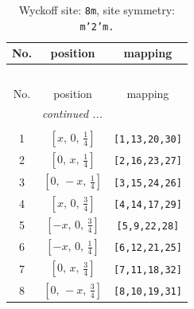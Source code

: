 \documentclass[fleqn,8pt]{jsarticle}
\begin{document}
\begin{longtable}{ccc}
\caption{Wyckoff site: {\tt 8m}, site symmetry: {\tt m'2'm.}}
 \\
 \hline \hline
No. & position & mapping \\ \hline \endfirsthead

\multicolumn{2}{l}{\tablename\ \thetable{}} \\
 \hline \hline
No. & position & mapping \\ \hline \endhead

 \hline \hline
\multicolumn{2}{r}{\footnotesize\it continued ...} \\ \endfoot

 \hline \hline
\multicolumn{2}{r}{} \\ \endlastfoot

1 & $\left[ x,\, 0,\, \frac{1}{4} \right]$ & {\tt [1,13,20,30]} \\ \hline
2 & $\left[ 0,\, x,\, \frac{1}{4} \right]$ & {\tt [2,16,23,27]} \\ \hline
3 & $\left[ 0,\, - x,\, \frac{1}{4} \right]$ & {\tt [3,15,24,26]} \\ \hline
4 & $\left[ x,\, 0,\, \frac{3}{4} \right]$ & {\tt [4,14,17,29]} \\ \hline
5 & $\left[ - x,\, 0,\, \frac{3}{4} \right]$ & {\tt [5,9,22,28]} \\ \hline
6 & $\left[ - x,\, 0,\, \frac{1}{4} \right]$ & {\tt [6,12,21,25]} \\ \hline
7 & $\left[ 0,\, x,\, \frac{3}{4} \right]$ & {\tt [7,11,18,32]} \\ \hline
8 & $\left[ 0,\, - x,\, \frac{3}{4} \right]$ & {\tt [8,10,19,31]} \\
\end{longtable}
\renewcommand{\arraystretch}{1.2}
\end{document}
